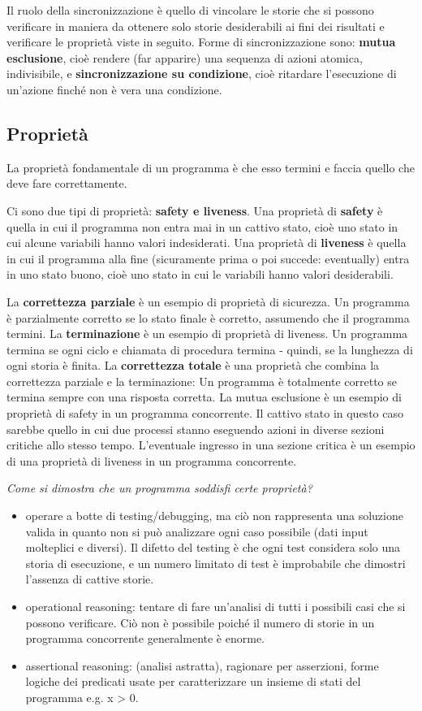 \documentclass[10pt,a4paper]{book}
\begin{document}
Il ruolo della sincronizzazione è quello di vincolare le storie che si possono verificare in maniera da ottenere solo storie desiderabili ai fini dei risultati e verificare le proprietà viste in seguito.
Forme di sincronizzazione sono: \textbf{mutua esclusione}, cioè rendere (far apparire) una sequenza di azioni atomica, indivisibile, e \textbf{sincronizzazione su condizione}, cioè ritardare l'esecuzione di un'azione finché non è vera una condizione.

\subsection{Proprietà}
\label{sec:prop-prog}
La proprietà fondamentale di un programma è che esso termini e faccia quello che deve fare correttamente.

Ci sono due tipi di proprietà: \textbf{safety e liveness}. Una proprietà di \textbf{safety} è quella in cui il programma non entra mai in un cattivo stato, cioè uno stato in cui alcune variabili hanno valori indesiderati.
Una proprietà di \textbf{liveness} è quella in cui il programma alla fine (sicuramente prima o poi succede: eventually) entra in uno stato buono, cioè uno stato in cui le variabili hanno valori desiderabili.

La \textbf{correttezza parziale} è un esempio di proprietà di sicurezza. Un programma è parzialmente corretto se lo stato finale è corretto, assumendo che il programma termini.
La \textbf{terminazione} è un esempio di proprietà di liveness. Un programma termina se ogni ciclo e chiamata di procedura termina - quindi, se la lunghezza di ogni storia è finita. La \textbf{correttezza totale} è una proprietà che combina la correttezza parziale e la terminazione: Un programma è totalmente corretto se termina sempre con una risposta corretta.
La mutua esclusione è un esempio di proprietà di safety in un programma concorrente. Il cattivo stato in questo caso sarebbe quello in cui due processi stanno eseguendo azioni in diverse sezioni critiche allo stesso tempo. L'eventuale ingresso in una sezione critica è un esempio di una proprietà di liveness in un programma concorrente.

\textit{Come si dimostra che un programma soddisfi certe proprietà?}
\begin{itemize}
\item operare a botte di testing/debugging, ma ciò non rappresenta una soluzione valida in quanto non si può analizzare ogni caso possibile (dati input molteplici e diversi). Il difetto del testing è che ogni test considera solo una storia di esecuzione, e un numero limitato di test è improbabile che dimostri l'assenza di cattive storie.
\item operational reasoning: tentare di fare un'analisi di tutti i possibili casi che si possono verificare. Ciò non è possibile poiché il numero di storie in un programma concorrente generalmente è enorme.
\item assertional reasoning: (analisi astratta), ragionare per asserzioni, forme logiche dei predicati usate per caratterizzare un insieme di stati del programma e.g. x > 0.
\end{itemize}
\end{document}
